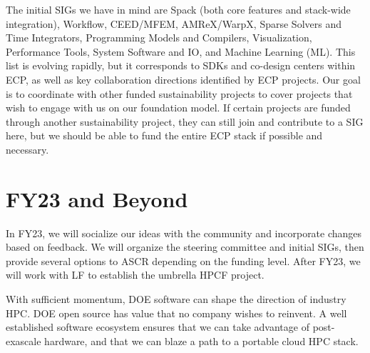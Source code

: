\documentclass[11pt]{article}
\begin{document}
The initial SIGs we have in mind are Spack (both core features and stack-wide
integration), Workflow, CEED/MFEM, AMReX/WarpX, Sparse Solvers and Time Integrators,
Programming Models and Compilers, Visualization, Performance Tools, System Software and
IO, and Machine Learning (ML). This list is evolving rapidly, but it corresponds to SDKs
and co-design centers within ECP, as well as key collaboration directions identified by
ECP projects. Our goal is to coordinate with other funded sustainability projects to
cover projects that wish to engage with us on our foundation model. If certain projects
are funded through another sustainability project, they can still join and contribute to
a SIG here, but we should be able to fund the entire ECP stack if possible and
necessary.

\section{FY23 and Beyond}

In FY23, we will socialize our ideas with the community and incorporate changes based on
feedback. We will organize the steering committee and initial SIGs, then provide several
options to ASCR depending on the funding level. After FY23, we will work with LF to
establish the umbrella HPCF project.

With sufficient momentum, DOE software can shape the direction of industry HPC.
DOE open source has value that no company wishes to reinvent. A well established
software ecosystem ensures that we can take advantage of post-exascale hardware, and
that we can blaze a path to a portable cloud HPC stack.




%
%  


\end{document}
